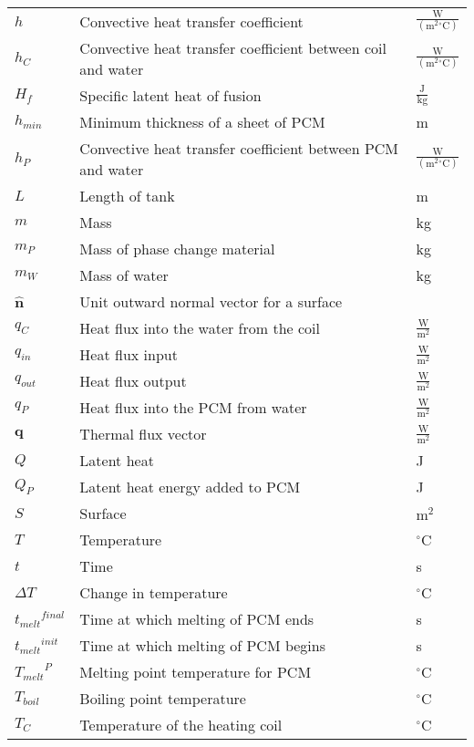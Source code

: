 \documentclass[12pt]{article}
\begin{document}
\begin{longtabu}{l X[l] l}
\\
$h$ & Convective heat transfer coefficient & $\frac{\text{W}}{(\text{m}^{2}{}^{\circ}\text{C})}$
\\
${h_{C}}$ & Convective heat transfer coefficient between coil and water & $\frac{\text{W}}{(\text{m}^{2}{}^{\circ}\text{C})}$
\\
${H_{f}}$ & Specific latent heat of fusion & $\frac{\text{J}}{\text{kg}}$
\\
${h_{min}}$ & Minimum thickness of a sheet of PCM & m
\\
${h_{P}}$ & Convective heat transfer coefficient between PCM and water & $\frac{\text{W}}{(\text{m}^{2}{}^{\circ}\text{C})}$
\\
$L$ & Length of tank & m
\\
$m$ & Mass & kg
\\
${m_{P}}$ & Mass of phase change material & kg
\\
${m_{W}}$ & Mass of water & kg
\\
$\mathbf{\hat{n}}$ & Unit outward normal vector for a surface & 
\\
${q_{C}}$ & Heat flux into the water from the coil & $\frac{\text{W}}{\text{m}^{2}}$
\\
${q_{in}}$ & Heat flux input & $\frac{\text{W}}{\text{m}^{2}}$
\\
${q_{out}}$ & Heat flux output & $\frac{\text{W}}{\text{m}^{2}}$
\\
${q_{P}}$ & Heat flux into the PCM from water & $\frac{\text{W}}{\text{m}^{2}}$
\\
$\mathbf{q}$ & Thermal flux vector & $\frac{\text{W}}{\text{m}^{2}}$
\\
$Q$ & Latent heat & J
\\
${Q_{P}}$ & Latent heat energy added to PCM & J
\\
$S$ & Surface & $\text{m}^{2}$
\\
$T$ & Temperature & ${}^{\circ}$C
\\
$t$ & Time & s
\\
$ΔT$ & Change in temperature & ${}^{\circ}$C
\\
${{t_{melt}}^{final}}$ & Time at which melting of PCM ends & s
\\
${{t_{melt}}^{init}}$ & Time at which melting of PCM begins & s
\\
${{T_{melt}}^{P}}$ & Melting point temperature for PCM & ${}^{\circ}$C
\\
${T_{boil}}$ & Boiling point temperature & ${}^{\circ}$C
\\
${T_{C}}$ & Temperature of the heating coil & ${}^{\circ}$C

\end{longtabu}
\end{document}

